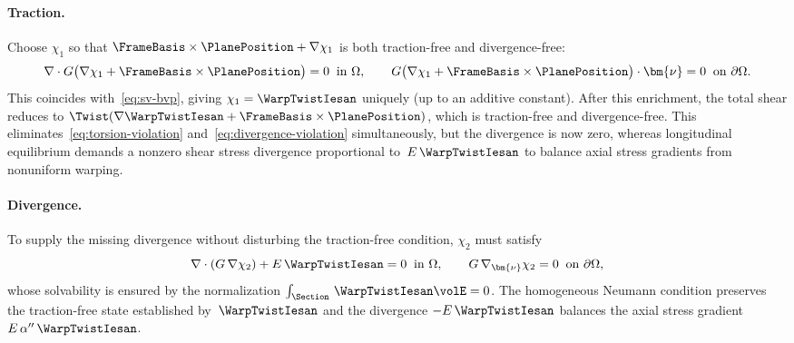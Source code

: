 \paragraph{Traction.}
Choose $\chi_1$ so that
$\FrameBasis\times\PlanePosition + \nabla\chi_1$ is both traction-free and
divergence-free:
\begin{equation}
  \nabla\cdot G\bigl(\nabla\chi_1
    + \FrameBasis\times\PlanePosition\bigr) = 0
  \;\;\text{in }\Omega, \qquad
  G\bigl(\nabla\chi_1
    + \FrameBasis\times\PlanePosition\bigr)\cdot\bm{\nu} = 0
  \;\;\text{on }\partial\Omega.
  \label{eq:chi1-bvp}
\end{equation}
This coincides with~\eqref{eq:sv-bvp}, giving $\chi_1 = \WarpTwistIesan$ uniquely (up to
an additive constant). 
After this enrichment, the total shear reduces to
$\Twist(\nabla\WarpTwistIesan + \FrameBasis\times\PlanePosition)$, which is traction-free
and divergence-free. 
This eliminates~\eqref{eq:torsion-violation}
and~\eqref{eq:divergence-violation} simultaneously, but the divergence is now
zero, whereas longitudinal equilibrium demands a nonzero shear stress
divergence proportional to~$E\,\WarpTwistIesan$ to balance axial stress gradients from
nonuniform warping.

\paragraph{Divergence.}
To supply the missing divergence without disturbing the traction-free condition, $\chi_2$ must satisfy
\begin{equation}
  \nabla\cdot(G\,\nabla\chi_2) + E\,\WarpTwistIesan = 0
  \;\;\text{in }\Omega, \qquad
  G\,\nabla_{\bm{\nu}}\chi_2= 0
  \;\;\text{on }\partial\Omega,
  \label{eq:fa-bvp}
\end{equation}
whose solvability is ensured by the normalization
$\int_{\Section} \,\WarpTwistIesan \volE = 0$. 
The homogeneous Neumann condition preserves the traction-free state established by~$\WarpTwistIesan$ and the divergence $-E\,\WarpTwistIesan$ balances the axial stress gradient $E\,\alpha''\,\WarpTwistIesan$. 

